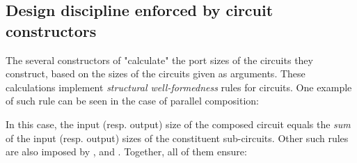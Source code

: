         \subsection{Design discipline enforced by circuit constructors}
            The several constructors of  "calculate" the port sizes of the circuits they construct,
            based on the sizes of the circuits given as arguments.
            These calculations implement \emph{structural well-formedness} rules for circuits.
            One example of such rule can be seen in the case of parallel composition:

            \begin{center}
                \begin{code}
                    \>[4] \<[11]%
                    \>[11]\AgdaSymbol{:}  \AgdaSymbol{\{}   \AgdaSymbol{\}} \<[30]%
                    \>[30]          \AgdaSymbol{(} \AgdaPrimitive{+} \AgdaSymbol{)} \AgdaSymbol{(} \AgdaPrimitive{+} \AgdaSymbol{)}\<%
                \end{code}
            \end{center}

            In this case, the input (resp. output) size of the composed circuit equals the \emph{sum}
            of the input (resp. output) sizes of the constituent sub-circuits.
            Other such rules are also imposed by ,  and .
            Together, all of them ensure:

